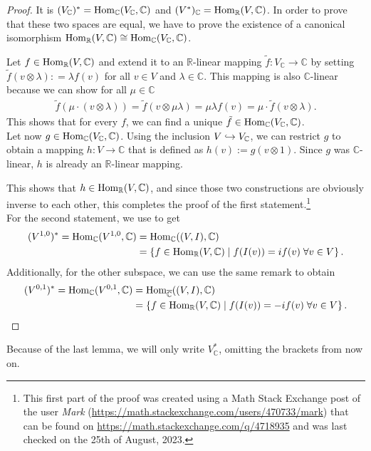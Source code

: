 \begin{proof}
	It is $(V_\mathbb{C})^* = \operatorname{Hom}_\mathbb{C} (V_\mathbb{C}, \mathbb{C})$ and 
	$(V^*)_\mathbb{C} = \operatorname{Hom}_\mathbb{R} (V, \mathbb{C})$. In order to prove that these two spaces 
	are equal, we have to prove the existence of a canonical isomorphism 
	$\operatorname{Hom}_\mathbb{R}(V,\mathbb{C}) \cong \operatorname{Hom}_\mathbb{C} (V_\mathbb{C}, \mathbb{C})$.
	
	Let $f \in \operatorname{Hom}_\mathbb{R}(V,\mathbb{C})$ and extend it to an $\mathbb{R}$-linear mapping
	$\tilde f: V_\mathbb{C} \rightarrow \mathbb{C}$ by setting $\tilde f(v \otimes \lambda): = \lambda
	f(v)$ for all $v \in V$ and $\lambda \in \mathbb{C}$. This mapping is also $\mathbb{C}$-linear
	because we can show for all $\mu \in \mathbb{C}$
	\begin{align*}
		\tilde f(\mu\cdot(v \otimes \lambda)) = \tilde f (v \otimes \mu\lambda) = \mu\lambda f(v) = \mu
		\cdot \tilde f (v \otimes \lambda).
	\end{align*}
	This shows that for every $f$, we can find a unique $\tilde f \in \operatorname{Hom}_\mathbb{C}(V_\mathbb{C},
	\mathbb{C})$.\\
	Let now $g \in \operatorname{Hom}_\mathbb{C}(V_\mathbb{C}, \mathbb{C})$. Using the inclusion 
	$V \hookrightarrow V_\mathbb{C}$, we can restrict $g$ to obtain a mapping $h: V \rightarrow \mathbb{C}$ 
	that is defined as $h(v):= g(v \otimes 1)$.
	Since $g$ was $\mathbb{C}$-linear, $h$ is already an $\mathbb{R}$-linear mapping.
	
	This shows that $h \in \operatorname{Hom}_\mathbb{R}(V,\mathbb{C})$, and since those two constructions are
	obviously inverse to each other, this completes the proof of the first statement.\footnote{This
		first part of the proof was created using a Math Stack Exchange post of the user \emph{Mark}
		(\url{https://math.stackexchange.com/users/470733/mark}) that can be found on
		\url{https://math.stackexchange.com/q/4718935} and was last checked on the 25th of August, 2023.}\\
	For the second statement, we use  to get
	\begin{align*}
		(V^{1,0})^* = \operatorname{Hom}_\mathbb{C}(V^{1,0},\mathbb{C})&= \operatorname{Hom}_\mathbb{C}((V,I),\mathbb{C}) \\&=
		\left\{f \in \operatorname{Hom}_\mathbb{R}(V,\mathbb{C}) \mid f(I(v)) = if(v)\; \forall v \in V\right\}.
	\end{align*}
	Additionally, for the other subspace, we can use the same remark to obtain
	\begin{align*}
		(V^{0,1})^* = \operatorname{Hom}_\mathbb{C}(V^{0,1},\mathbb{C}) &= \operatorname{Hom}_{\overline{\mathbb{C}}}((V,I),
		\mathbb{C}) \\&= \left\{f \in \operatorname{Hom}_\mathbb{R}(V,\mathbb{C})\mid f(I(v)) = -if(v)\; \forall v \in
		V\right\}.
	\end{align*}
\end{proof}
\begin{nota}
	Because of the last lemma, we will only write $V^*_\mathbb{C}$, omitting the brackets from now on.
\end{nota}
